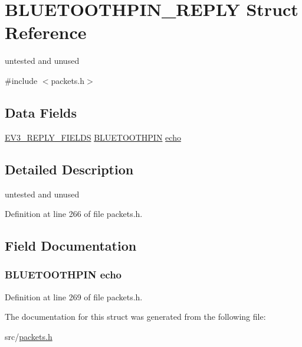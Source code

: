 \hypertarget{struct_b_l_u_e_t_o_o_t_h_p_i_n___r_e_p_l_y}{}\section{B\+L\+U\+E\+T\+O\+O\+T\+H\+P\+I\+N\+\_\+\+R\+E\+P\+L\+Y Struct Reference}
\label{struct_b_l_u_e_t_o_o_t_h_p_i_n___r_e_p_l_y}


untested and unused  




{\ttfamily \#include $<$packets.\+h$>$}

\subsection*{Data Fields}
\begin{DoxyCompactItemize}
\item 
\hyperlink{packets_8h_a382c165d520d462ac8f0c88e2a1970cb}{E\+V3\+\_\+\+R\+E\+P\+L\+Y\+\_\+\+F\+I\+E\+L\+D\+S} \hyperlink{packets_8h_ac3a1ac8c2841ebbffc2c5b6aa98a167f}{B\+L\+U\+E\+T\+O\+O\+T\+H\+P\+I\+N} \hyperlink{struct_b_l_u_e_t_o_o_t_h_p_i_n___r_e_p_l_y_a8d07e741a40e15d64742a8cd763227b0}{echo}
\end{DoxyCompactItemize}


\subsection{Detailed Description}
untested and unused 

Definition at line 266 of file packets.\+h.



\subsection{Field Documentation}
\hypertarget{struct_b_l_u_e_t_o_o_t_h_p_i_n___r_e_p_l_y_a8d07e741a40e15d64742a8cd763227b0}{}
\subsubsection[{echo}]{ {\bf B\+L\+U\+E\+T\+O\+O\+T\+H\+P\+I\+N} echo}\label{struct_b_l_u_e_t_o_o_t_h_p_i_n___r_e_p_l_y_a8d07e741a40e15d64742a8cd763227b0}


Definition at line 269 of file packets.\+h.



The documentation for this struct was generated from the following file\+:\begin{DoxyCompactItemize}
\item 
src/\hyperlink{packets_8h}{packets.\+h}\end{DoxyCompactItemize}

